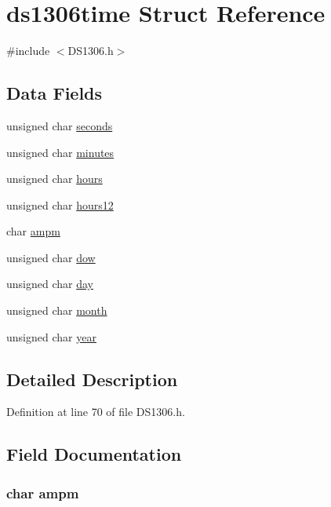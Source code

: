 \hypertarget{structds1306time}{\section{ds1306time Struct Reference}
\label{structds1306time}
}


{\ttfamily \#include $<$D\-S1306.\-h$>$}

\subsection*{Data Fields}
\begin{DoxyCompactItemize}
\item 
unsigned char \hyperlink{structds1306time_a173027d8c297c3e800a19ec32217953e}{seconds}
\item 
unsigned char \hyperlink{structds1306time_acf4ceb0d1cb80a37559ed7fd414cd389}{minutes}
\item 
unsigned char \hyperlink{structds1306time_ad6bf06b59feb7f83117fd66cd2f365ad}{hours}
\item 
unsigned char \hyperlink{structds1306time_ab51bff648a0be672b522ac48e8da69fc}{hours12}
\item 
char \hyperlink{structds1306time_ab107d7a2945b7954fcf45a0e3c129f03}{ampm}
\item 
unsigned char \hyperlink{structds1306time_a75aeb148620066973ea11791d72dc7cc}{dow}
\item 
unsigned char \hyperlink{structds1306time_ab9ba6d415537c392fea1a330751865f9}{day}
\item 
unsigned char \hyperlink{structds1306time_a4900720b55a67c901372712af062d615}{month}
\item 
unsigned char \hyperlink{structds1306time_a189605ebe7fb094d2d8d511d855c4bb0}{year}
\end{DoxyCompactItemize}


\subsection{Detailed Description}


Definition at line 70 of file D\-S1306.\-h.



\subsection{Field Documentation}
\hypertarget{structds1306time_ab107d7a2945b7954fcf45a0e3c129f03}{
\subsubsection[{ampm}]{\setlength{\rightskip}{0pt plus 5cm}char ampm}}\label{structds1306time_ab107d7a2945b7954fcf45a0e3c129f03}



